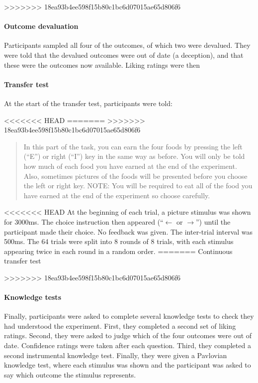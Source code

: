 \documentclass[12pt]{article}
\begin{document}
>>>>>>> 18ea93b4ee598f15b80c1bc6d07015ae65d806f6
\paragraph{Outcome devaluation}
Participants sampled all four of the outcomes, of which two were devalued. They
were told that the devalued outcomes were out of date (a deception), and that
these were the outcomes now available. Liking ratings were then 

\paragraph{Transfer test}
At the start of the transfer test, participants were told: 

<<<<<<< HEAD
=======
>>>>>>> 18ea93b4ee598f15b80c1bc6d07015ae65d806f6
\blockquote{In this part of the task, you can earn the four foods by pressing
the left (``E'') or right (``I'') key in the same way as before. You will only
be told how much of each food you have earned at the end of the experiment.
Also, sometimes pictures of the foods will be presented before you choose the
left or right key. NOTE: You will be required to eat all of the food you have
earned at the end of the experiment so choose carefully.}

<<<<<<< HEAD
At the beginning of each trial, a picture stimulus was shown for 3000ms. The
choice instruction then appeared (``$\leftarrow$ or $\rightarrow$'') until the
participant made their choice. No feedback was given. The inter-trial interval
was 500ms. The 64 trials were split into 8 rounds of 8 trials, with each
stimulus appearing twice in each round in a random order. 
=======
Continuous transfer test


>>>>>>> 18ea93b4ee598f15b80c1bc6d07015ae65d806f6

\paragraph{Knowledge tests}
Finally, participants were asked to complete several knowledge tests to check
they had understood the experiment. First, they completed a second set of
liking ratings. Second, they were asked to judge which of the four outcomes 
were out of date. Confidence ratings were taken after each question. Third,
they completed a second instrumental knowledge test. Finally, they were given a
Pavlovian knowledge test, where each stimulus was shown and the participant was
asked to say which outcome the stimulus represents. 
\end{document}
